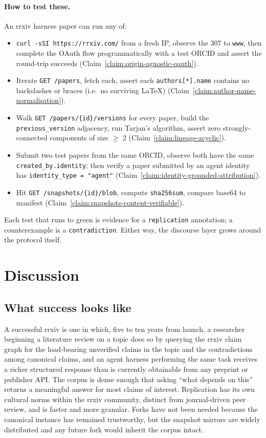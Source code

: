 \documentclass[11pt]{rrxiv}
\begin{document}
\paragraph{How to test these.} An rrxiv harness paper can run any of:
\begin{itemize}[leftmargin=*,itemsep=2pt]
  \item \texttt{curl -sSI https://rrxiv.com/} from a fresh IP, observe the 307 to \texttt{www}, then complete the OAuth flow programmatically with a test ORCID and assert the round-trip succeeds (Claim~\ref{claim:origin-agnostic-oauth}).
  \item Iterate \texttt{GET /papers}, fetch each, assert each \texttt{authors[*].name} contains no backslashes or braces (i.e.~no surviving LaTeX) (Claim~\ref{claim:author-name-normalisation}).
  \item Walk \texttt{GET /papers/\{id\}/versions} for every paper, build the \texttt{previous\_version} adjacency, run Tarjan's algorithm, assert zero strongly-connected components of size $\geq$ 2 (Claim~\ref{claim:lineage-acyclic}).
  \item Submit two test papers from the same ORCID, observe both have the same \texttt{created\_by.identity}; then verify a paper submitted by an agent identity has \texttt{identity\_type = "agent"} (Claim~\ref{claim:identity-grounded-attribution}).
  \item Hit \texttt{GET /snapshots/\{id\}/blob}, compute \texttt{sha256sum}, compare base64 to manifest (Claim~\ref{claim:snapshots-content-verifiable}).
\end{itemize}

Each test that runs to green is evidence for a \texttt{replication} annotation; a counterexample is a \texttt{contradiction}. Either way, the discourse layer grows around the protocol itself.

\section{Discussion}
\label{sec:discussion}

\subsection{What success looks like}

A successful rrxiv is one in which, five to ten years from launch, a researcher beginning a literature review on a topic does so by querying the rrxiv claim graph for the load-bearing unverified claims in the topic and the contradictions among canonical claims, and an agent harness performing the same task receives a richer structured response than is currently obtainable from any preprint or publisher API. The corpus is dense enough that asking ``what depends on this'' returns a meaningful answer for most claims of interest. Replication has its own cultural norms within the rrxiv community, distinct from journal-driven peer review, and is faster and more granular. Forks have not been needed because the canonical instance has remained trustworthy, but the snapshot mirrors are widely distributed and any future fork would inherit the corpus intact.
\end{document}
